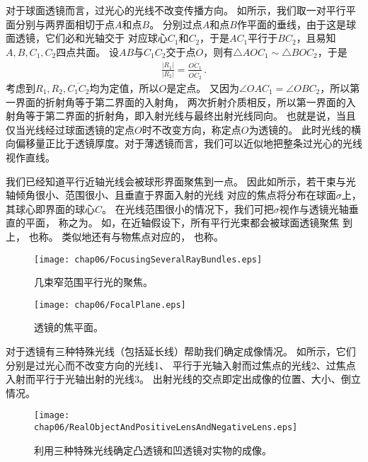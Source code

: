 对于球面透镜而言，过光心的光线不改变传播方向。
如所示，我们取一对平行平面分别与两界面相切于点$A$和点$B$。
分别过点$A$和点$B$作平面的垂线，由于这是球面透镜，它们必和光轴交于
对应球心$C_1$和$C_2$，于是$AC_1$平行于$BC_2$，且易知$A, B, C_1, C_2$四点共面。
设$AB$与$C_1C_2$交于点$O$，则有$\triangle AOC_1\sim\triangle BOC_2$，于是
\begin{align}
    \frac{|R_1|}{|R_2|}=\frac{\overline{OC_1}}{\overline{OC_2}}\, .
\end{align}
考虑到$R_1, R_2, \overline{C_1C_2}$均为定值，所以$O$是定点。
又因为$\angle OAC_1=\angle OBC_2$，所以第一界面的折射角等于第二界面的入射角，
两次折射介质相反，所以第一界面的入射角等于第二界面的折射角，即入射光线与最终出射光线同向。
也就是说，当且仅当光线经过球面透镜的定点$O$时不改变方向，称定点$O$为透镜的。
此时光线的横向偏移量正比于透镜厚度。对于薄透镜而言，我们可以近似地把整条过光心的光线视作直线。

我们已经知道平行近轴光线会被球形界面聚焦到一点。
因此如所示，若干束与光轴倾角很小、范围很小、且垂直于界面入射的光线
对应的焦点将分布在球面$\sigma$上，其球心即界面的球心$C$。
在光线范围很小的情况下，我们可把$\sigma$视作与透镜光轴垂直的平面，
称之为。
如，在近轴假设下，所有平行光束都会被球面透镜聚焦
到上，
也称。
类似地还有与物焦点对应的，
也称。
\begin{figure}[htbp]
    \centering\texttt{[image: chap06/FocusingSeveralRayBundles.eps]}
    \caption{几束窄范围平行光的聚焦。}
    \label{fig:6.36}
\end{figure}
\begin{figure}[htbp]
    \centering\texttt{[image: chap06/FocalPlane.eps]}
    \caption{透镜的焦平面。}
    \label{fig:6.37}
\end{figure}

对于透镜有三种特殊光线（包括延长线）帮助我们确定成像情况。
如所示，它们分别是过光心而不改变方向的光线1、
平行于光轴入射而过焦点的光线2、过焦点入射而平行于光轴出射的光线3。
出射光线的交点即定出成像的位置、大小、倒立情况。
\begin{figure}[htbp]
    \centering\texttt{[image: chap06/RealObjectAndPositiveLensAndNegativeLens.eps]}
    \caption{利用三种特殊光线确定凸透镜和凹透镜对实物的成像。}
    \label{fig:6.38}
\end{figure}


